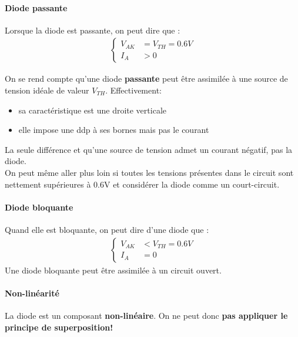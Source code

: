 \documentclass[a4paper]{article}
\begin{document}
    \paragraph{Diode passante}
    Lorsque la diode est passante, on peut dire que :
    \begin{align*}
        \begin{cases}
            V_{AK} &= V_{TH} = 0.6V\\
            I_A &> 0
        \end{cases}
    \end{align*}

    On se rend compte qu'une diode \textbf{passante} peut être assimilée à une
    source de tension idéale de valeur $V_{TH}$. Effectivement:
    \begin{itemize}
        \item sa caractéristique est une droite verticale
        \item elle impose une ddp à ses bornes mais pas le courant
    \end{itemize}
    La seule différence et qu'une source de tension admet un courant négatif, pas la diode.\\

    On peut même aller plus loin si toutes les tensions présentes dans le circuit
    sont nettement supérieures à 0.6V et considérer la diode comme un court-circuit.

    \paragraph{Diode bloquante}
    Quand elle est bloquante, on peut dire d'une diode que :
    \begin{align*}
        \begin{cases}
            V_{AK} &< V_{TH} = 0.6V\\
            I_A &= 0
        \end{cases}
    \end{align*}
    Une diode bloquante peut être assimilée à un circuit ouvert.

    \paragraph{Non-linéarité} La diode est un composant \textbf{non-linéaire}.
    On ne peut donc \textbf{pas appliquer le principe de superposition!}
\end{document}
